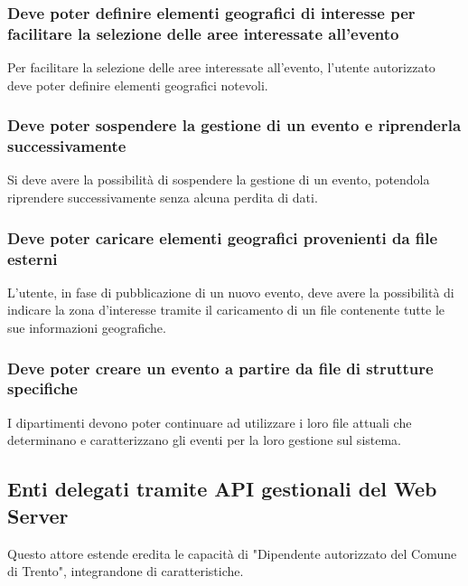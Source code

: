\documentclass{article}
\begin{document}
\subsubsection{Deve poter definire elementi geografici di interesse per facilitare la selezione delle aree interessate all'evento}
Per facilitare la selezione delle aree interessate all'evento, l'utente autorizzato deve poter definire elementi geografici notevoli.

\subsubsection{Deve poter sospendere la gestione di un evento e riprenderla successivamente}
Si deve avere la possibilità di sospendere la gestione di un evento, potendola riprendere successivamente senza alcuna perdita di dati.

\subsubsection{Deve poter caricare elementi geografici provenienti da file esterni}
L'utente, in fase di pubblicazione di un nuovo evento, deve avere la possibilità di indicare la zona d'interesse tramite il caricamento di un file contenente tutte le sue informazioni geografiche.

\subsubsection{Deve poter creare un evento a partire da file di strutture specifiche}
I dipartimenti devono poter continuare ad utilizzare i loro file attuali che determinano e caratterizzano gli eventi per la loro gestione sul sistema.

\subsection{Enti delegati tramite API gestionali del Web Server}
Questo attore estende eredita le capacità di "Dipendente autorizzato del Comune di Trento", integrandone di caratteristiche.
\end{document}
